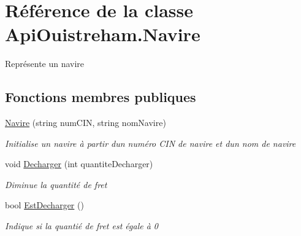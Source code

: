 \hypertarget{class_api_ouistreham_1_1_navire}{}\section{Référence de la classe Api\+Ouistreham.\+Navire}
\label{class_api_ouistreham_1_1_navire}


Représente un navire  


\subsection*{Fonctions membres publiques}
\begin{DoxyCompactItemize}
\item 
\hyperlink{class_api_ouistreham_1_1_navire_aa570acf88770400f8d2702256dce5a21}{Navire} (string num\+C\+IN, string nom\+Navire)
\begin{DoxyCompactList}\small\item\em Initialise un navire à partir d\textquotesingle{}un numéro C\+IN de navire et d\textquotesingle{}un nom de navire \end{DoxyCompactList}\item 
void \hyperlink{class_api_ouistreham_1_1_navire_ab9e8ee30d5c11742d5127c3af6acdba2}{Decharger} (int quantite\+Decharger)
\begin{DoxyCompactList}\small\item\em Diminue la quantité de fret \end{DoxyCompactList}\item 
bool \hyperlink{class_api_ouistreham_1_1_navire_af985f63194e727c05a19a7493e8cf4b4}{Est\+Decharger} ()
\begin{DoxyCompactList}\small\item\em Indique si la quantié de fret est égale à 0 \end{DoxyCompactList}\end{DoxyCompactItemize}
